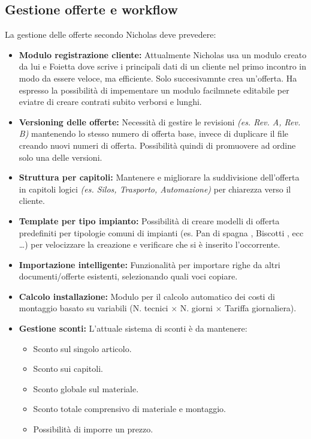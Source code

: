 \documentclass[12pt, a4paper]{article} %
\begin{document}
\subsection{Gestione offerte e workflow}
La gestione delle offerte secondo Nicholas deve prevedere:
\begin{itemize}
      \item \textbf{Modulo registrazione cliente:} Attualmente Nicholas usa un modulo creato da lui e Foietta dove scrive i principali dati di un cliente nel primo incontro in modo da essere veloce, ma efficiente. Solo succesivamnte crea un'offerta.
            Ha espresso la possibilità di impementare un modulo facilmnete editabile per eviatre di creare contrati subito verborsi e lunghi.
      \item \textbf{Versioning delle offerte:} Necessità di gestire le revisioni \textit{(es. Rev. A, Rev. B)} mantenendo lo stesso numero di offerta base,
            invece di duplicare il file creando nuovi numeri di offerta. Possibilità quindi di promuovere ad ordine solo una delle versioni.
      \item \textbf{Struttura per capitoli:} Mantenere e migliorare la suddivisione dell'offerta in capitoli logici \textit{(es. Silos, Trasporto, Automazione)}
            per chiarezza verso il cliente.
      \item \textbf{Template per tipo impianto:} Possibilità di creare modelli di offerta predefiniti per tipologie comuni di impianti
            (es. Pan di spagna , Biscotti , ecc \dots) per velocizzare la creazione e verificare che si è inserito l'occorrente.
      \item \textbf{Importazione intelligente:} Funzionalità per importare righe da altri documenti/offerte esistenti, selezionando quali voci copiare.
      \item \textbf{Calcolo installazione:} Modulo per il calcolo automatico dei costi di montaggio basato su variabili
            (N. tecnici $\times$ N. giorni $\times$ Tariffa giornaliera).
      \item \textbf{Gestione sconti:} L'attuale sistema di sconti è da mantenere:
            \begin{itemize}
                  \item Sconto sul singolo articolo.
                  \item Sconto sui capitoli.
                  \item Sconto globale sul materiale.
                  \item Sconto totale comprensivo di materiale e montaggio.
                  \item Possibilità di imporre un prezzo.
            \end{itemize}
\end{itemize}
\end{document}
